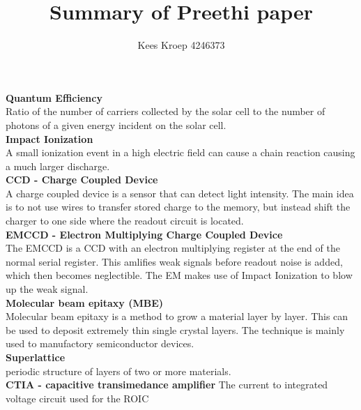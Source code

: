 \documentclass{article}
\title{Summary of Preethi paper}
\author{Kees Kroep 4246373}
\begin{document}
  \maketitle

  \textbf{Quantum Efficiency}\\
  Ratio of the number of carriers collected by the solar cell to the number of photons of a given energy incident on the solar cell.
\\

\textbf{Impact Ionization}\\
A small ionization event in a high electric field can cause a chain reaction causing a much larger discharge.\\

\textbf{CCD - Charge Coupled Device}\\
A charge coupled device is a sensor that can detect light intensity. The main idea is to not use wires to transfer stored charge to the memory, but instead shift the charger to one side where the readout circuit is located.\\

  \textbf{EMCCD - Electron Multiplying Charge Coupled Device}\\
The EMCCD is a CCD with an electron multiplying register at the end of the normal serial register. This amlifies weak signals before readout noise is added, which then becomes neglectible. The EM makes use of Impact Ionization to blow up the weak signal. \\

\textbf{Molecular beam epitaxy (MBE)}\\
Molecular beam epitaxy is a method to grow a material layer by layer. This can be used to deposit extremely thin single crystal layers. The technique is mainly used to manufactory semiconductor devices.\\

\textbf{Superlattice}\\
periodic structure of layers of two or more materials. \\

\textbf{CTIA - capacitive transimedance amplifier}
The current to integrated voltage circuit used for the ROIC


  
\end{document}
